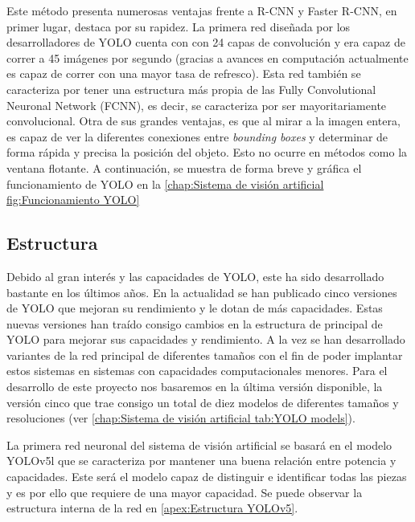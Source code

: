 Este método presenta numerosas ventajas frente a R-CNN y Faster R-CNN, en primer lugar, destaca por su rapidez. La primera red diseñada por los desarrolladores de YOLO cuenta con con 24 capas de convolución y era capaz de correr a 45 imágenes por segundo (gracias a avances en computación actualmente es capaz de correr con una mayor tasa de refresco). Esta red también se caracteriza por tener una estructura más propia de las Fully Convolutional Neuronal Network (FCNN), es decir, se caracteriza por ser mayoritariamente convolucional. Otra de sus grandes ventajas, es que al mirar a la imagen entera, es capaz de ver la diferentes conexiones entre \textit{bounding boxes} y determinar de forma rápida y precisa la posición del objeto. Esto no ocurre en métodos como la ventana flotante. A continuación, se muestra de forma breve y gráfica el funcionamiento de YOLO en la \autoref{chap:Sistema de visión artificial fig:Funcionamiento YOLO}

\subsection{Estructura}
\label{chap:Sistema de visión artificial subsec:YOLO Estructura}
Debido al gran interés y las capacidades de YOLO, este ha sido desarrollado bastante en los últimos años. En la actualidad se han publicado cinco versiones de YOLO que mejoran su rendimiento y le dotan de más capacidades. Estas nuevas versiones han traído consigo cambios en la estructura de principal de YOLO para mejorar sus capacidades y rendimiento. A la vez se han desarrollado variantes de la red principal de diferentes tamaños con el fin de poder implantar estos sistemas en sistemas con capacidades computacionales menores. Para el desarrollo de este proyecto nos basaremos en la última versión disponible, la versión cinco que trae consigo un total de diez modelos de diferentes tamaños y resoluciones (ver \autoref{chap:Sistema de visión artificial tab:YOLO models}).

La primera red neuronal del sistema de visión artificial se basará en el modelo YOLOv5l que se caracteriza por mantener una buena relación entre potencia y capacidades. Este será el modelo capaz de distinguir e identificar todas las piezas y es por ello que requiere de una mayor capacidad. Se puede observar la estructura interna de la red en \autoref{apex:Estructura YOLOv5}.

